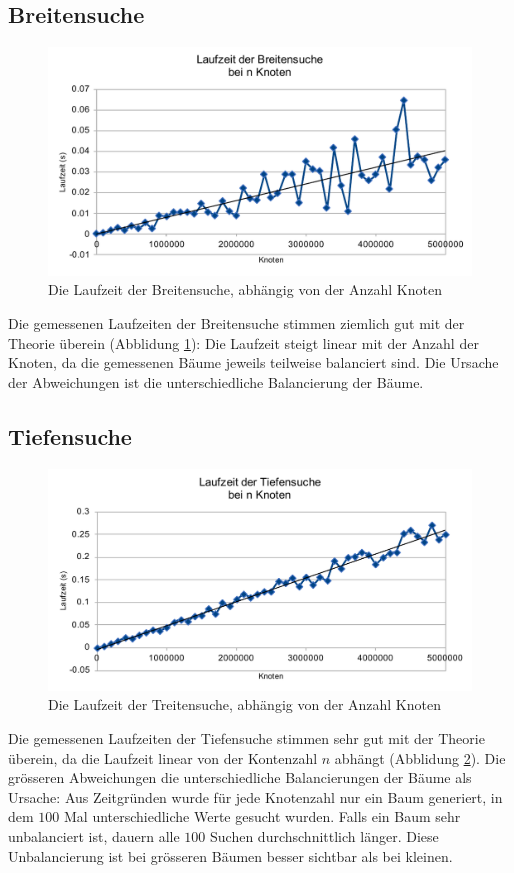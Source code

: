 \documentclass[a4paper,11pt]{article}
\begin{document}
\subsection{Breitensuche}
	\begin{figure}[ht]
		\centering
		\includegraphics[width=0.85\linewidth]{img/BFS_size.pdf}
		\caption{Die Laufzeit der Breitensuche, abhängig von der Anzahl Knoten}
		\label{fig:bfs_time}
	\end{figure}
	
Die gemessenen Laufzeiten der Breitensuche stimmen ziemlich gut mit der Theorie überein (Abblidung \ref{fig:bfs_time}): Die Laufzeit steigt linear mit der Anzahl der Knoten, da die gemessenen Bäume jeweils teilweise balanciert sind. Die Ursache der Abweichungen ist die unterschiedliche Balancierung der Bäume.
\subsection{Tiefensuche}

	\begin{figure}[ht]
		\centering
		\includegraphics[width=0.85\linewidth]{img/DFS_size.pdf}
		\caption{Die Laufzeit der Treitensuche, abhängig von der Anzahl Knoten}
		\label{fig:dfs_time}
	\end{figure}
	
Die gemessenen Laufzeiten der Tiefensuche stimmen sehr gut mit der Theorie überein, da die Laufzeit linear von der Kontenzahl $n$ abhängt (Abblidung \ref{fig:dfs_time}). Die grösseren Abweichungen die unterschiedliche Balancierungen der Bäume als Ursache: Aus Zeitgründen wurde für jede Knotenzahl nur ein Baum generiert, in dem $100$ Mal unterschiedliche Werte gesucht wurden. Falls ein Baum sehr unbalanciert ist, dauern alle $100$ Suchen durchschnittlich länger. Diese Unbalancierung ist bei grösseren Bäumen besser sichtbar als bei kleinen.
\end{document}
